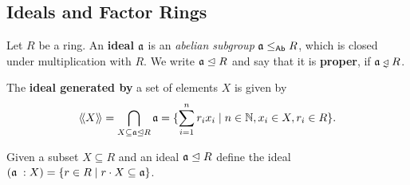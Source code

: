 	\newpage
	\subsection{Ideals and Factor Rings}
	\begin{definition}
		Let $R$ be a ring. An \textbf{ideal} $\mathfrak{a}$ is an \textit{abelian subgroup} $\mathfrak{a} \leq_{\textsf{Ab}} R$, which is closed under multiplication with $R$. We write $\mathfrak{a} \trianglelefteq R$ and say that it is \textbf{proper}, if $\ideal{a} \divneq R$.

		The \textbf{ideal generated by} a set of elements $X$ is given by 
		\begin{equation*}
			\langle\!\langle X \rangle\!\rangle = \bigcap \limits_{X \subseteq \mathfrak{a} \trianglelefteq R} \mathfrak{a} = \{\sum \limits_{i=1}^n r_ix_i \mid n \in \mathbb{N}, x_i \in X, r_i \in R\}.
		\end{equation*}
	\end{definition}

	Given a subset $X \subseteq R$ and an ideal $\mathfrak{a}\trianglelefteq R$ define the ideal $(\mathfrak{a}\;:X) = \{r \in R \mid r\cdot X \subseteq \mathfrak{a}\}$. 


